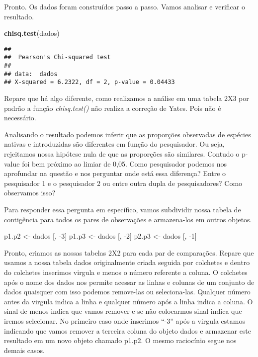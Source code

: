 \documentclass[]{book}
\newenvironment{Shaded}{\begin{snugshade}}{\end{snugshade}}
\newcommand{\DecValTok}[1]{\textcolor[rgb]{0.00,0.00,0.81}{#1}}
\newcommand{\KeywordTok}[1]{\textcolor[rgb]{0.13,0.29,0.53}{\textbf{#1}}}
\newcommand{\NormalTok}[1]{#1}
\newcommand{\StringTok}[1]{\textcolor[rgb]{0.31,0.60,0.02}{#1}}
\begin{document}
Pronto. Os dados foram construídos passo a passo. Vamos analisar e verificar o resultado.

\begin{Shaded}
\begin{Highlighting}[]
\KeywordTok{chisq.test}\NormalTok{(dados)}
\end{Highlighting}
\end{Shaded}

\begin{verbatim}
## 
##  Pearson's Chi-squared test
## 
## data:  dados
## X-squared = 6.2322, df = 2, p-value = 0.04433
\end{verbatim}

Repare que há algo diferente, como realizamos a análise em uma tabela 2X3 por padrão a função \emph{chisq.test()} não realiza a correção de Yates. Pois não é necessário.

Analisando o resultado podemos inferir que as proporções observadas de espécies nativas e introduzidas são diferentes em função do pesquisador. Ou seja, rejeitamos nossa hipótese nula de que as proporções são similares. Contudo o p-value foi bem próximo ao limiar de 0,05. Como pesquisador podemos nos aprofundar na questão e nos perguntar onde está essa diferença? Entre o pesquisador 1 e o pesquisador 2 ou entre outra dupla de pesquisadores? Como observamos isso?

Para responder essa pergunta em específico, vamos subdividir nossa tabela de contigência para todos os pares de observações e armazena-los em outros objetos.

\begin{Shaded}
\begin{Highlighting}[]
\NormalTok{p1.p2 <-}\StringTok{ }\NormalTok{dados [, }\DecValTok{-3}\NormalTok{]}
\NormalTok{p1.p3 <-}\StringTok{ }\NormalTok{dados [, }\DecValTok{-2}\NormalTok{]}
\NormalTok{p2.p3 <-}\StringTok{ }\NormalTok{dados [, }\DecValTok{-1}\NormalTok{]}
\end{Highlighting}
\end{Shaded}

Pronto, criamos as nossas tabelas 2X2 para cada par de comparações. Repare que usamos a nossa tabela dados originalmente criada seguida por colchetes e dentro do colchetes inserimos virgula e menos o número referente a coluna. O colchetes após o nome dos dados nos permite acessar as linhas e colunas de um conjunto de dados quaisquer com isso podemos remove-las ou seleciona-las. Qualquer número antes da virgula indica a linha e qualquer número após a linha indica a coluna. O sinal de menos indica que vamos remover e se não colocarmos sinal indica que iremos selecionar. No primeiro caso onde inserimos ``-3'' após a virgula estamos indicando que vamos remover a terceira coluna do objeto dados e armazenar este resultado em um novo objeto chamado p1.p2. O mesmo raciocínio segue nos demais casos.
\end{document}
